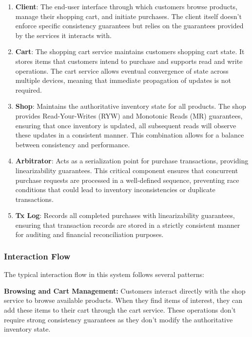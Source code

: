 {  \begin{enumerate}
    \item \textbf{Client}: The end-user interface through which
      customers browse products, manage their shopping cart, and
      initiate purchases. The client itself doesn't enforce specific
      consistency guarantees but relies on the guarantees provided by
      the services it interacts with.

    \item \textbf{Cart}: The shopping cart service maintains customers
      shopping cart state. It stores items that customers intend to
      purchase and supports read and write operations. The cart service
      allows eventual convergence of state across multiple devices,
      meaning that immediate propagation of updates is not required.

    \item \textbf{Shop}: Maintains the authoritative inventory state
      for all products. The shop provides Read-Your-Writes (RYW) and
      Monotonic Reads (MR) guarantees, ensuring that once inventory is
      updated, all subsequent reads will observe these updates in a
      consistent manner. This combination allows for a balance between
      consistency and performance.

    \item \textbf{Arbitrator}: Acts as a serialization point for
      purchase transactions, providing linearizability guarantees. This
      critical component ensures that concurrent purchase requests are
      processed in a well-defined sequence, preventing race conditions
      that could lead to inventory inconsistencies or duplicate transactions.

    \item \textbf{Tx Log}: Records all completed purchases
      with linearizability guarantees, ensuring that transaction
      records are stored in a strictly consistent manner for auditing
      and financial reconciliation purposes.
  \end{enumerate}

  \subsubsection{Interaction Flow}

  The typical interaction flow in this system follows several patterns:

  \textbf{Browsing and Cart Management:} Customers interact directly
  with the shop service to browse available products. When they find
  items of interest, they can add these items to their cart through the
  cart service. These operations don't require strong consistency
  guarantees as they don't modify the authoritative inventory state.

}

